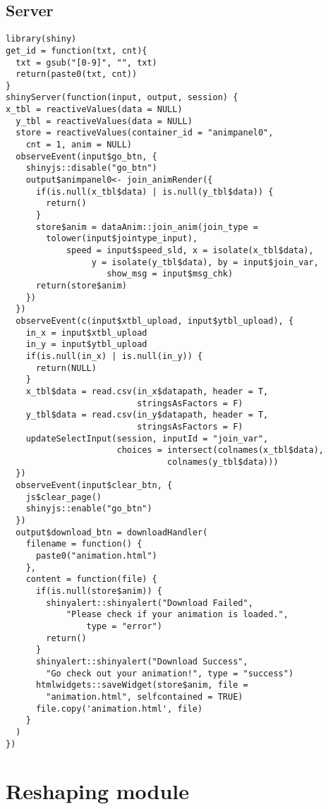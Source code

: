 \subsection{Server}
\begin{lstlisting}
library(shiny)
get_id = function(txt, cnt){
  txt = gsub("[0-9]", "", txt)
  return(paste0(txt, cnt))
}
shinyServer(function(input, output, session) {
x_tbl = reactiveValues(data = NULL)
  y_tbl = reactiveValues(data = NULL)
  store = reactiveValues(container_id = "animpanel0", 
    cnt = 1, anim = NULL)
  observeEvent(input$go_btn, {
    shinyjs::disable("go_btn")
    output$animpanel0<- join_animRender({
      if(is.null(x_tbl$data) | is.null(y_tbl$data)) {
        return()
      }
      store$anim = dataAnim::join_anim(join_type = 
        tolower(input$jointype_input), 
            speed = input$speed_sld, x = isolate(x_tbl$data),
                 y = isolate(y_tbl$data), by = input$join_var,
                    show_msg = input$msg_chk)
      return(store$anim)
    })
  })
  observeEvent(c(input$xtbl_upload, input$ytbl_upload), {
    in_x = input$xtbl_upload
    in_y = input$ytbl_upload
    if(is.null(in_x) | is.null(in_y)) {
      return(NULL)
    }
    x_tbl$data = read.csv(in_x$datapath, header = T,
                          stringsAsFactors = F)
    y_tbl$data = read.csv(in_y$datapath, header = T,
                          stringsAsFactors = F)
    updateSelectInput(session, inputId = "join_var",
                      choices = intersect(colnames(x_tbl$data),
                                colnames(y_tbl$data)))
  })
  observeEvent(input$clear_btn, {
    js$clear_page()
    shinyjs::enable("go_btn")
  })
  output$download_btn = downloadHandler(
    filename = function() {
      paste0("animation.html")
    },
    content = function(file) {
      if(is.null(store$anim)) {
        shinyalert::shinyalert("Download Failed", 
            "Please check if your animation is loaded.",
                type = "error")
        return()
      }
      shinyalert::shinyalert("Download Success", 
        "Go check out your animation!", type = "success")
      htmlwidgets::saveWidget(store$anim, file = 
        "animation.html", selfcontained = TRUE)
      file.copy('animation.html', file)
    }
  )
})

\end{lstlisting}

\section{Reshaping module}

